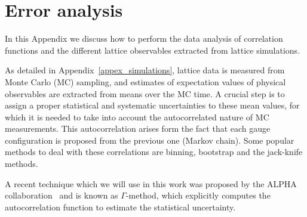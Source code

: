 
\chapter{Error analysis}
\label{appex_errors}

In this Appendix we discuss how to perform the data analysis of correlation functions and the different lattice observables extracted from lattice simulations. 

As detailed in Appendix~\ref{appex_simulations}, lattice data is measured from Monte Carlo (MC) sampling, and estimates of expectation values of physical observables are extracted from means over the MC time. A crucial step is to assign a proper statistical and systematic uncertainties to these mean values, for which it is needed to take into account the autocorrelated nature of MC measurements. This autocorrelation arises form the fact that each gauge configuration is proposed from the previous one (Markov chain). Some popular methods to deal with these correlations are binning, bootstrap and the jack-knife methods.

A recent technique which we will use in this work was proposed by the ALPHA collaboration~\citep{Schaefer:2010hu,Wolff:2003sm,Ramos:2018vgu} and is known as $\Gamma$-method, which explicitly computes the autocorrelation function to estimate the statistical uncertainty.


